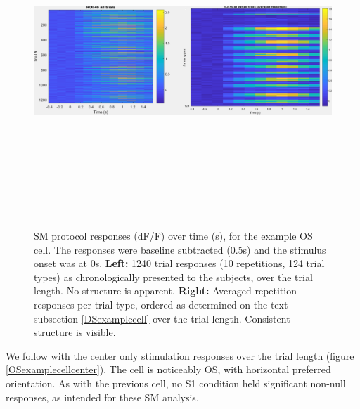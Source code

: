 \begin{figure}[H] \centering \includegraphics[width=12.5cm,height=12.5cm,keepaspectratio]{Figures/7.Results/individualSM/roi_46_mf379_pos2/roi46.png} 
\caption{SM protocol responses (dF/F) over time (s), for the example OS cell. The responses were baseline subtracted (0.5s) and the stimulus onset was at 0s.
\newline \textbf{Left:} 1240 trial responses (10 repetitions, 124 trial types) as chronologically presented to the subjects, over the trial length. No structure is apparent.
\newline \textbf{Right:} Averaged repetition responses per trial type, ordered as determined on the text subsection \ref{DSexamplecell} over the trial length. Consistent structure is visible. \label{individualOStrials}}
\end{figure}

We follow with the center only stimulation responses over the trial length (figure \ref{OSexamplecellcenter}). The cell is noticeably OS, with horizontal preferred orientation. As with the previous cell, no S1 condition held significant non-null responses, as intended for these SM analysis.

